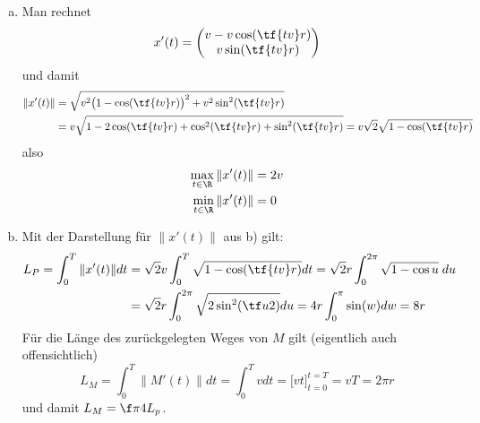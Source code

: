 \documentclass[a4paper]{scrartcl}
\begin{document}
\begin{aufgabe}
\begin{enumerate}[a)]
	\item
		Man rechnet
		\begin{align*}
			x'(t) = \begin{pmatrix}
				v- v \cos(\tf{tv}r) \\
				v \sin(\tf{tv}r)
			\end{pmatrix}
		\end{align*}
		und damit
		\begin{align*}
			\| x'(t) \|
			&= \sqrt{v^2\big(1-\cos (\tf{tv}r)\big)^2 + v^2 \sin^2(\tf{tv}r)} \\
			&= v \sqrt{1- 2 \cos (\tf{tv}r) + \cos^2 (\tf {tv}r) + \sin^2 (\tf {tv}r)} 
			= v \sqrt{2} \sqrt{1 - \cos (\tf {tv}r)}
		\end{align*}
		also
		\begin{align*}
			\max_{t\in \R} \|x'(t)\| &= 2v \\
			\min_{t\in \R} \|x'(t)\| &= 0
		\end{align*}
	\item
		Mit der Darstellung für $\|x'(t)\|$ aus b) gilt:
		\begin{align*}
			L_P = \int_0^T \|x'(t)\| dt
			&= \sqrt 2 v \int_0^T \sqrt{1 -\cos (\tf {tv}r)} dt
			= \sqrt 2 r \int_0^{2\pi} \sqrt{1 - \cos u} \; du \\
			&= \sqrt 2 r \int_0^{2\pi} \sqrt{2 \sin^2 (\tf u2)} du
			= 4 r \int_0^{\pi} \sin(w) dw 
			= 8 r
		\end{align*}
		Für die Länge des zurückgelegten Weges von $M$ gilt (eigentlich auch offensichtlich)
		\[
			L_M 
			= \int_0^T \|M'(t)\| dt 
			= \int_0^T v dt 
			= \big[ v t \big]_{t=0}^{t=T}
			= v T
			= 2 \pi r
		\]
		und damit $L_M = \f \pi 4 L_p$.
		\end{enumerate}
	\end{aufgabe}
\end{document}
